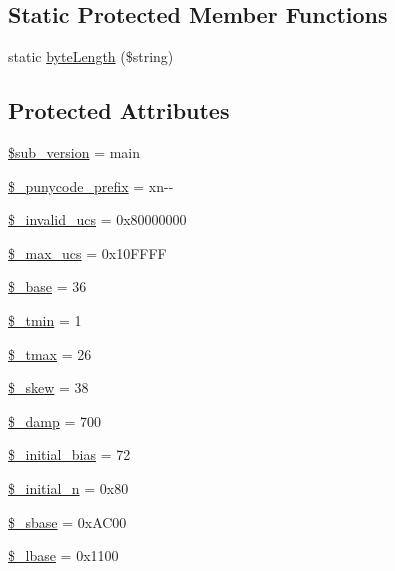\subsection*{Static Protected Member Functions}
\begin{DoxyCompactItemize}
\item 
static \hyperlink{classidna__convert_a964eafd23cc4069f6aa9912bcdfb61c7}{byte\+Length} (\$string)
\end{DoxyCompactItemize}
\subsection*{Protected Attributes}
\begin{DoxyCompactItemize}
\item 
\hyperlink{classidna__convert_a14d96b4efeba28496661be46a6f14a5c}{\$sub\+\_\+version} = \textquotesingle{}main\textquotesingle{}
\item 
\hyperlink{classidna__convert_a314677b13ded35e088abec26ef7c8be8}{\$\+\_\+punycode\+\_\+prefix} = \textquotesingle{}xn-\/-\/\textquotesingle{}
\item 
\hyperlink{classidna__convert_a741bab9cbe7aec53249d714143bbe53b}{\$\+\_\+invalid\+\_\+ucs} = 0x80000000
\item 
\hyperlink{classidna__convert_aea20377d4d2659186a1901d6a66f5d58}{\$\+\_\+max\+\_\+ucs} = 0x10\+F\+F\+FF
\item 
\hyperlink{classidna__convert_ae8b8b5bddd4d164dea30f7097274ac24}{\$\+\_\+base} = 36
\item 
\hyperlink{classidna__convert_a25ba1aab448cedd1159da1a09fb97720}{\$\+\_\+tmin} = 1
\item 
\hyperlink{classidna__convert_a44dfb166546f087150aa6c1ffdde2473}{\$\+\_\+tmax} = 26
\item 
\hyperlink{classidna__convert_ae444bd5e85604ec097705a95ab21f144}{\$\+\_\+skew} = 38
\item 
\hyperlink{classidna__convert_af291107adc3fc7062e734fe5654a5b4c}{\$\+\_\+damp} = 700
\item 
\hyperlink{classidna__convert_a9baf9ea9ebceee6e4dffb60cce1d20bc}{\$\+\_\+initial\+\_\+bias} = 72
\item 
\hyperlink{classidna__convert_a02dd88f575541a67a6312a15af340733}{\$\+\_\+initial\+\_\+n} = 0x80
\item 
\hyperlink{classidna__convert_ab4e5849131d5a242fc67d3bb75f81899}{\$\+\_\+sbase} = 0x\+A\+C00
\item 
\hyperlink{classidna__convert_a50c50cda465aefe78b8ed69ae6cd6247}{\$\+\_\+lbase} = 0x1100

\end{DoxyCompactItemize}
